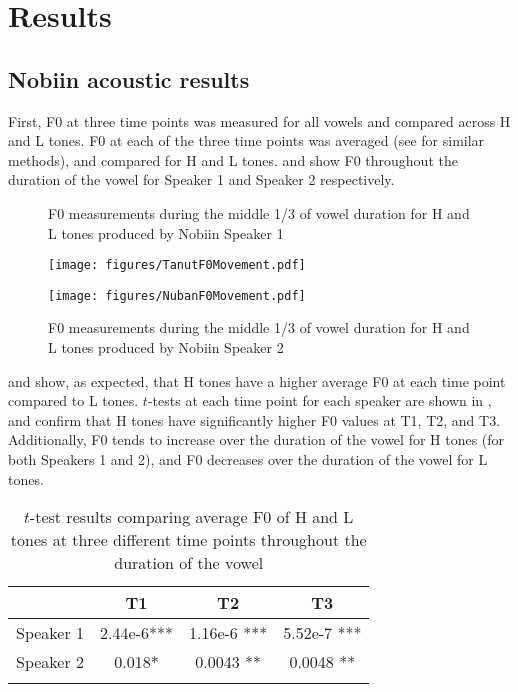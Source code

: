 \documentclass[output=paper]{langscibook}
\begin{document}
\section{Results}\label{sec:oakley:Results}\label{sec:oakley:3}
\subsection{Nobiin acoustic results}
First, F0 at three time points was measured for all vowels and compared across H and L tones. F0 at each of the three time points was averaged (see \cite{svantesson2006} for similar methods), and compared for H and L tones.  and  show F0 throughout the duration of the vowel for Speaker 1 and Speaker 2 respectively. 

\begin{figure}
 \begin{floatrow}
  \captionsetup{margin=.05\linewidth}
   \ffigbox
     {\caption{F0 measurements during the middle 1/3 of vowel duration for H and L tones produced by Nobiin Speaker 1}\label{fig:oakley:TanutPitchTones}}
     {\texttt{[image: figures/TanutF0Movement.pdf]}}%
   \ffigbox
     {\caption{F0 measurements during the middle 1/3 of vowel duration for H and L tones produced by Nobiin Speaker 2\label{fig:oakley:TonePitchNuban}}}
     {\texttt{[image: figures/NubanF0Movement.pdf]}}
 \end{floatrow}
\end{figure}

 and  show, as expected, that H tones have a higher average F0 at each time point compared to L tones. $t$-tests at each time point for each speaker are shown in , and confirm that H tones have significantly higher F0 values at T1, T2, and T3. Additionally, F0 tends to increase over the duration of the vowel for H tones (for both Speakers 1 and 2), and F0 decreases over the duration of the vowel for L tones.


\begin{table}
\caption{$t$-test results comparing average F0 of H and L tones at three different time points throughout the duration of the vowel\label{tab:oakley:F0MovementTTest}}
\begin{tabular}{l *{3}{S[table-align-text-after=false,table-align-exponent=false,table-format=1.4e1{***}]}}
\lsptoprule
          & {T1} & {T2} & {T3}\\ 
\midrule
Speaker 1 & 2.44e-6{***}& 1.16e-6 {***} & 5.52e-7 {***}\\ 
Speaker 2 & 0.018{*}& 0.0043 {**} & 0.0048 {**}\\ 
\lspbottomrule
\end{tabular}
\end{table}
\end{document}
